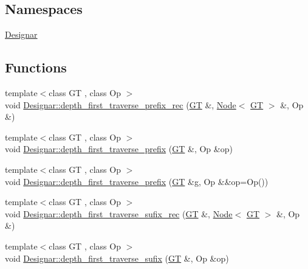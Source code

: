 \subsection*{Namespaces}
\begin{DoxyCompactItemize}
\item 
 \hyperlink{namespace_designar}{Designar}
\end{DoxyCompactItemize}
\subsection*{Functions}
\begin{DoxyCompactItemize}
\item 
{\footnotesize template$<$class GT , class Op $>$ }\\void \hyperlink{namespace_designar_a0b89964c32afcc315905100d3ae49ad6}{Designar\+::depth\+\_\+first\+\_\+traverse\+\_\+prefix\+\_\+rec} (\hyperlink{demo-buildgraph_8_c_a3001c40d2c31ca87ed96cd7d1334a55e}{GT} \&, \hyperlink{test-mtreenode_8_c_a17a24b0725f59987143c5faf63c4dc6f}{Node}$<$ \hyperlink{demo-buildgraph_8_c_a3001c40d2c31ca87ed96cd7d1334a55e}{GT} $>$ \&, Op \&)
\item 
{\footnotesize template$<$class GT , class Op $>$ }\\void \hyperlink{namespace_designar_a2c0d9c0ea5841058afe514c4451ab869}{Designar\+::depth\+\_\+first\+\_\+traverse\+\_\+prefix} (\hyperlink{demo-buildgraph_8_c_a3001c40d2c31ca87ed96cd7d1334a55e}{GT} \&, Op \&op)
\item 
{\footnotesize template$<$class GT , class Op $>$ }\\void \hyperlink{namespace_designar_afaa79311647a603f5c95d575f67ea767}{Designar\+::depth\+\_\+first\+\_\+traverse\+\_\+prefix} (\hyperlink{demo-buildgraph_8_c_a3001c40d2c31ca87ed96cd7d1334a55e}{GT} \&g, Op \&\&op=Op())
\item 
{\footnotesize template$<$class GT , class Op $>$ }\\void \hyperlink{namespace_designar_ab028f52b5df8eed5dadeda85d45fa0f2}{Designar\+::depth\+\_\+first\+\_\+traverse\+\_\+sufix\+\_\+rec} (\hyperlink{demo-buildgraph_8_c_a3001c40d2c31ca87ed96cd7d1334a55e}{GT} \&, \hyperlink{test-mtreenode_8_c_a17a24b0725f59987143c5faf63c4dc6f}{Node}$<$ \hyperlink{demo-buildgraph_8_c_a3001c40d2c31ca87ed96cd7d1334a55e}{GT} $>$ \&, Op \&)
\item 
{\footnotesize template$<$class GT , class Op $>$ }\\void \hyperlink{namespace_designar_a91a3b6c7321dec6f2d9579721af465a1}{Designar\+::depth\+\_\+first\+\_\+traverse\+\_\+sufix} (\hyperlink{demo-buildgraph_8_c_a3001c40d2c31ca87ed96cd7d1334a55e}{GT} \&, Op \&op)

\end{DoxyCompactItemize}
